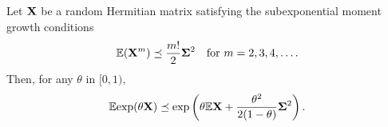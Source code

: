 \begin{lemma}
Let $\mathbf{X}$ be a random Hermitian matrix satisfying the subexponential
moment growth conditions
\[
\mathbb{E} (\mathbf{X}^m) \preceq \frac{m!}{2} \mathbf{\Sigma}^2 \quad \text{for }
m=2,3,4,\ldots.
\]
Then, for any $\theta$ in $[0,1),$
\[
 \mathbb{E} \mathrm{exp}(\theta \mathbf{X}) \preceq \mathrm{exp}\left( \theta \mathbb{E} \mathbf{X} +
\frac{\theta^2}{2(1 - \theta)} \mathbf{\Sigma}^2 \right).
\]
\label{ch1:lemma:growthbernsteinmgf}
\end{lemma}

%
% 
% 
% 
% 
